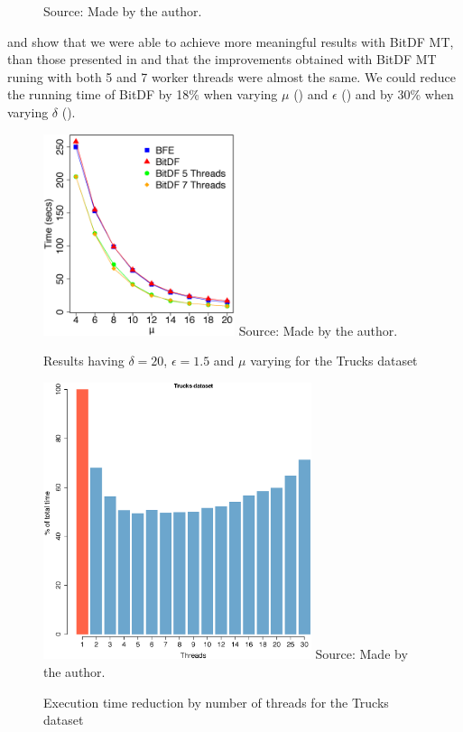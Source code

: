 {\begin{figure}[h!]
\begin{subfigure}[t]{0.49\textwidth}
        \label{fig:trucks_complete_vary_g}
    \end{subfigure}
    \footnotesize{Source: Made by the author.}
    \label{fig:trucks_complete_results}
\end{figure}

 and  show that we were able to achieve more
meaningful results with BitDF MT, than those presented in  and that the improvements obtained with
BitDF MT runing with both 5 and 7 worker threads were almost the same. We could reduce the running time of BitDF by 18\%
when varying $\mu$ () and $\epsilon$ () and by
30\% when varying $\delta$ ().

\begin{figure}[h!]
    \centering
    \caption{Results having $\delta = 20$, $\epsilon = 1.5$ and $\mu$ varying for the Trucks dataset}
    \includegraphics[width=0.5\textwidth]{images/Trucks_complete_varying_n.eps}
    \footnotesize{Source: Made by the author.}
    \label{fig:trucks_complete_vary_n}
\end{figure}

\begin{figure}[h!]
    \centering
    \caption{Execution time reduction by number of threads for the Trucks dataset}
    \includegraphics[width=0.7\textwidth]{images/Trucks_thread.eps}
    \footnotesize{Source: Made by the author.}
    \label{fig:trucks_threads}
\end{figure}

}
